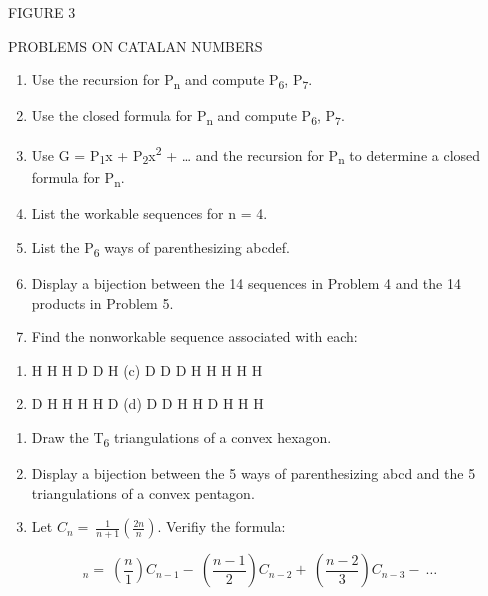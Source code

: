 \documentclass[10pt,letter]{article}
\begin{document}
FIGURE 3

PROBLEMS ON CATALAN NUMBERS

\begin{enumerate}
\def\labelenumi{\arabic{enumi}.}

\item
  Use the recursion for P\textsubscript{n} and compute
  P\textsubscript{6}, P\textsubscript{7}.
\item
  Use the closed formula for P\textsubscript{n} and compute
  P\textsubscript{6}, P\textsubscript{7}.
\item
  Use G = P\textsubscript{1}x + P\textsubscript{2}x\textsuperscript{2} +
  \ldots{} and the recursion for P\textsubscript{n} to determine a
  closed formula for P\textsubscript{n}.
\item
  List the workable sequences for n = 4.
\item
  List the P\textsubscript{6} ways of parenthesizing abcdef.
\item
  Display a bijection between the 14 sequences in Problem 4 and the 14
  products in Problem 5.
\item
  Find the nonworkable sequence associated with each:

\end{enumerate}

\begin{enumerate}
\def\labelenumi{(\alph{enumi})}

\item
  H H H D D H (c) D D D H H H H H
\item
  D H H H H D (d) D D H H D H H H

\end{enumerate}

\begin{enumerate}
\def\labelenumi{\arabic{enumi}.}

\item
  Draw the T\textsubscript{6} triangulations of a convex hexagon.
\item
  Display a bijection between the 5 ways of parenthesizing abcd and the
  5 triangulations of a convex pentagon.
\item
  Let \(C_{n} = \ \frac{1}{n + 1}\left( \frac{2n}{n} \right).\) Verifiy
  the formula:

\end{enumerate}

\[
_{n} = \ \left( \frac{n}{1} \right)C_{n - 1} - \ \left( \frac{n - 1}{2} \right)C_{n - 2} + \ \left( \frac{n - 2}{3} \right)C_{n - 3} - \ \ldots
\]
\end{document}
